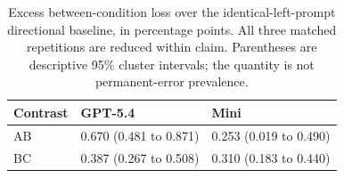 \begin{table}[htbp]\centering\small
\caption{Excess between-condition loss over the identical-left-prompt directional baseline, in percentage points. All three matched repetitions are reduced within claim. Parentheses are descriptive 95\% cluster intervals; the quantity is not permanent-error prevalence.}\label{tab:excess}
\begin{tabularx}{\linewidth}{lXX}\toprule
Contrast & GPT-5.4 & Mini \\\midrule
AB & 0.670 (0.481 to 0.871) & 0.253 (0.019 to 0.490) \\
BC & 0.387 (0.267 to 0.508) & 0.310 (0.183 to 0.440) \\
\bottomrule
\end{tabularx}
\end{table}